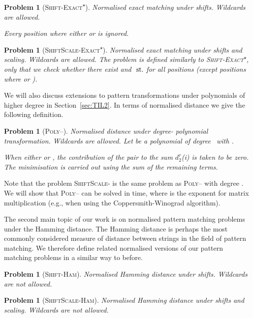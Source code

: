 \documentclass[11pt]{article}
\makeatletter
\newcommand{\st}{\ensuremath{\text{ st.\@ }}}
\newcommand{\wildcard}{\ensuremath{\star}\xspace}
\newcommand{\sExactWild}{\textsc{Shift-Exact\textsuperscript{\wildcard}}\xspace}
\newcommand{\ssExactWild}{\textsc{ShiftScale-Exact\textsuperscript{\wildcard}}\xspace}
\newcommand{\ssLtwoWild}{\textsc{ShiftScale-}\xspace}
\newcommand{\LpolyWild}{\textsc{Poly--}\xspace}
\newcommand{\DLpolyWild}{\ensuremath{d_2^r}}
\newcommand{\sHam}{\textsc{Shift-Ham}\xspace}
\newcommand{\ssHam}{\textsc{ShiftScale-Ham}\xspace}
\theoremstyle{plain}
\newtheorem{problem}[theorem]{Problem}
\theoremstyle{definition}
\makeatother
\begin{document}
\begin{problem}[\sExactWild]
    \label{prob:sExactWild}
    Normalised exact matching under shifts. Wildcards are allowed.

Every position  where either  or  is ignored.
\end{problem}

\begin{problem}[\ssExactWild]
    \label{prob:ssExactWild}
    Normalised exact matching under shifts and scaling. Wildcards are allowed. The problem is defined similarly to \sExactWild, only that we check whether there exist  and  \st  for all positions  (except positions where  or ).
\end{problem}

We will also discuss extensions to pattern transformations under polynomials of higher degree in Section~\ref{sec:TIL2}. In terms of normalised  distance we give the following definition.

\begin{problem}[\LpolyWild]
    \label{prob:LpolyWild}
    Normalised  distance under degree- polynomial transformation. Wildcards are allowed. Let  be a polynomial of degree~ with .

When either  or , the contribution of the pair to the sum \DLpolyWild(i) is taken to be zero. The minimisation is carried out using the sum of the remaining terms.
\end{problem}

Note that the problem \ssLtwoWild is the same problem as \LpolyWild with degree . We will show that \LpolyWild can be solved in  time, where  is the exponent for matrix multiplication (e.g.,  when using the Coppersmith-Winograd algorithm).

The second main topic of our work is on normalised pattern matching problems under the Hamming distance. The Hamming distance is perhaps the most commonly considered measure of distance between strings in the field of pattern matching. We therefore define related normalised versions of our pattern matching problems in a similar way to before.

\begin{problem}[\sHam]
    \label{prob:sHam}
    Normalised Hamming distance under shifts. Wildcards are not allowed.

\end{problem}

\begin{problem}[\ssHam]
    \label{prob:ssHam}
    Normalised Hamming distance under shifts and scaling. Wildcards are not allowed.

\end{problem}
\end{document}
